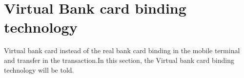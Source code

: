\documentclass[journal]{IEEEtran}
\begin{document}
%


\section{Virtual Bank card binding technology}
Virtual bank card instead of the real bank card binding in the mobile terminal and transfer in the transaction.In this section, the Virtual bank card binding technology will be told. 

\end{document}
